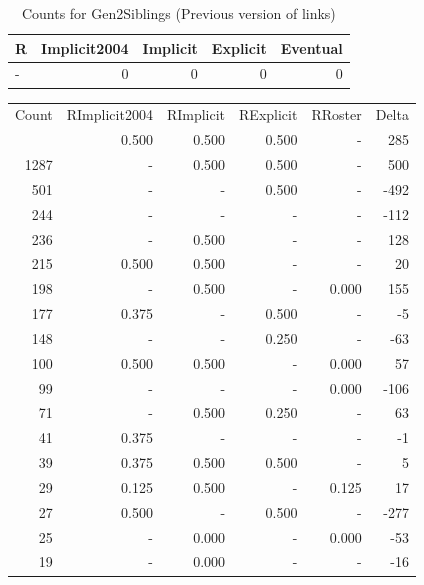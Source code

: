 \documentclass[a4paper]{article}\usepackage[]{graphicx}\usepackage[]{color}
\begin{document}
\begin{table}[ht]
\centering
{\large
\begin{tabular}{lrrrr}
  \hline
R & Implicit2004 & Implicit & Explicit & Eventual \\ 
  \hline
- &   0 &   0 &   0 &   0 \\ 
   \hline
\end{tabular}
}
\caption{Counts for Gen2Siblings (Previous version of links)} 
\end{table}



\begin{table}[ht]
\centering
\begin{tabular}{rrrrrr}
  \hline
Count & RImplicit2004 & RImplicit & RExplicit & RRoster & Delta \\ 
  \rowcolor{goodColor}  \hline
1477 & 0.500 & 0.500 & 0.500 & - & 285 \\ 
   \rowcolor{goodColor} 1287 & - & 0.500 & 0.500 & - & 500 \\ 
   \rowcolor{sosoColor} 501 & - & - & 0.500 & - & -492 \\ 
   \rowcolor{nullColor} 244 & - & - & - & - & -112 \\ 
  236 & - & 0.500 & - & - & 128 \\ 
  215 & 0.500 & 0.500 & - & - & 20 \\ 
  198 & - & 0.500 & - & 0.000 & 155 \\ 
   \rowcolor{sosoColor} 177 & 0.375 & - & 0.500 & - & -5 \\ 
   \rowcolor{sosoColor} 148 & - & - & 0.250 & - & -63 \\ 
  100 & 0.500 & 0.500 & - & 0.000 & 57 \\ 
   \rowcolor{nullColor} 99 & - & - & - & 0.000 & -106 \\ 
   \rowcolor{badColor} 71 & - & 0.500 & 0.250 & - & 63 \\ 
   \rowcolor{nullColor} 41 & 0.375 & - & - & - & -1 \\ 
   \rowcolor{goodColor} 39 & 0.375 & 0.500 & 0.500 & - & 5 \\ 
  29 & 0.125 & 0.500 & - & 0.125 & 17 \\ 
   \rowcolor{sosoColor} 27 & 0.500 & - & 0.500 & - & -277 \\ 
  25 & - & 0.000 & - & 0.000 & -53 \\ 
  19 & - & 0.000 & - & - & -16 \\ 

\end{tabular}
\end{table}
\end{document}
